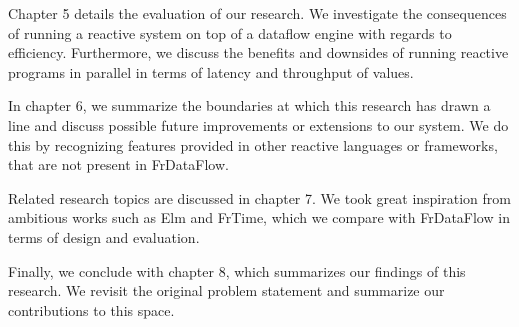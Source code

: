 Chapter 5 details the evaluation of our research. We investigate the consequences of running a reactive system on top of a dataflow engine with regards to efficiency. Furthermore, we discuss the benefits and downsides of running reactive programs in parallel in terms of latency and throughput of values. 

In chapter 6, we summarize the boundaries at which this research has drawn a line and discuss possible future improvements or extensions to our system. We do this by recognizing features provided in other reactive languages or frameworks, that are not present in FrDataFlow. 

Related research topics are discussed in chapter 7. We took great inspiration from ambitious works such as Elm and FrTime, which we compare with FrDataFlow in terms of design and evaluation. 

Finally, we conclude with chapter 8, which summarizes our findings of this research. We revisit the original problem statement and summarize our contributions to this space. 
